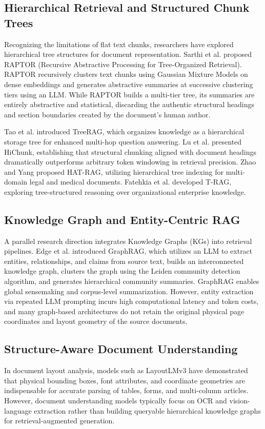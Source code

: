 \documentclass[12pt,a4paper]{report}
\begin{document}
\subsection{Hierarchical Retrieval and Structured Chunk Trees}
Recognizing the limitations of flat text chunks, researchers have explored hierarchical tree structures for document representation. Sarthi et al. \cite{sarthi2024raptor} proposed RAPTOR (Recursive Abstractive Processing for Tree-Organized Retrieval). RAPTOR recursively clusters text chunks using Gaussian Mixture Models on dense embeddings and generates abstractive summaries at successive clustering tiers using an LLM. While RAPTOR builds a multi-tier tree, its summaries are entirely abstractive and statistical, discarding the authentic structural headings and section boundaries created by the document's human author.

Tao et al. \cite{tao2025treerag} introduced TreeRAG, which organizes knowledge as a hierarchical storage tree for enhanced multi-hop question answering. Lu et al. \cite{lu2025hichunk} presented HiChunk, establishing that structural chunking aligned with document headings dramatically outperforms arbitrary token windowing in retrieval precision. Zhao and Yang \cite{zhao2024hatrag} proposed HAT-RAG, utilizing hierarchical tree indexing for multi-domain legal and medical documents. Fatehkia et al. \cite{fatehkia2024trag} developed T-RAG, exploring tree-structured reasoning over organizational enterprise knowledge.

\subsection{Knowledge Graph and Entity-Centric RAG}
A parallel research direction integrates Knowledge Graphs (KGs) into retrieval pipelines. Edge et al. \cite{edge2024graphrag} introduced GraphRAG, which utilizes an LLM to extract entities, relationships, and claims from source text, builds an interconnected knowledge graph, clusters the graph using the Leiden community detection algorithm, and generates hierarchical community summaries. GraphRAG enables global sensemaking and corpus-level summarization. However, entity extraction via repeated LLM prompting incurs high computational latency and token costs, and many graph-based architectures do not retain the original physical page coordinates and layout geometry of the source documents.

\subsection{Structure-Aware Document Understanding}
In document layout analysis, models such as LayoutLMv3 \cite{huang2022layoutlmv3} have demonstrated that physical bounding boxes, font attributes, and coordinate geometries are indispensable for accurate parsing of tables, forms, and multi-column articles. However, document understanding models typically focus on OCR and vision-language extraction rather than building queryable hierarchical knowledge graphs for retrieval-augmented generation.
\end{document}
